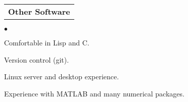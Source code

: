 \documentclass[11pt]{article}
\begin{document}
\noindent 
\begin{tabular*}{\textwidth}{l@{\extracolsep{\fill}}}
\textbf{Other Software}
\end{tabular*}
{\small

\noindent
\begin{list}{$\bullet$}{
}
\item Comfortable in Lisp and C.
\item Version control (git).
\item Linux server and desktop experience.
\item Experience with MATLAB and many numerical packages.
\end{list}
}
\end{document}
